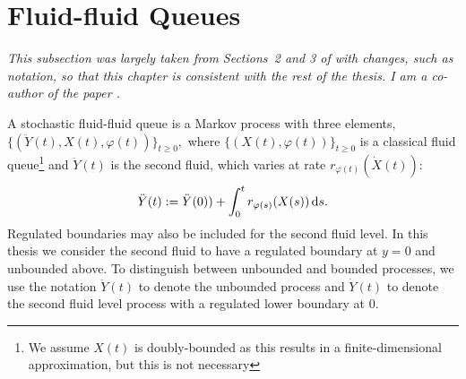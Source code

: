 
\section{Fluid-fluid Queues}\label{sec: ffq intro}
	\label{sec:prelim}
	\begin{center}
		\begin{minipage}{0.8\textwidth}
			\textit{This subsection was largely taken from Sections~2 and 3 of \cite{blnos2022} with changes, such as notation, so that this chapter is consistent with the rest of the thesis. I am a co-author of the paper \cite{blnos2022}. %
			}
		\end{minipage}
		\end{center}

A stochastic fluid-fluid queue \citep{bo2013} is a Markov process with three elements, $\{( \ddot{Y}(t),{X}(t), \varphi(t))\}_{t \geq 0},$ where $\{(X(t),\varphi(t))\}_{t\geq 0}$ is a classical fluid queue\footnote{We assume \(X(t)\) is doubly-bounded as this results in a finite-dimensional approximation, but this is not necessary} and $\ddot{Y}(t)$ is the second fluid, which varies at rate $r_{\varphi(t)}(\dot{X}(t))$:
% 
\begin{align*} 
	\ddot{Y}(t) := \ddot Y(0)) + \int_0^t r_{\varphi(s)}({X}(s)) \, \mathrm{d} s.
\end{align*} 
% 
Regulated boundaries may also be included for the second fluid level. In this thesis we consider the second fluid to have a regulated boundary at \(y=0\) and unbounded above. To distinguish between unbounded and bounded processes, we use the notation \(\ddot Y(t)\) to denote the unbounded process and \(\dot Y(t)\) to denote the second fluid level process with a regulated lower boundary at 0.


